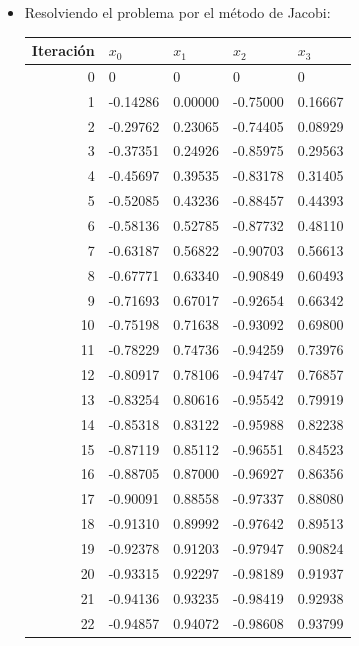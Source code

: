 \begin{itemize}
\item Resolviendo el problema por el método de Jacobi:

    \begin{center}
    \begin{tabular}{r|llll}
        Iteración & $x_0$ & $x_1$ & $x_2$ & $x_3$ \\
        \hline
        0 & 0 & 0 & 0 & 0 \\
        1 & -0.14286 & 0.00000 & -0.75000 & 0.16667 \\
        2 & -0.29762 & 0.23065 & -0.74405 & 0.08929 \\
        3 & -0.37351 & 0.24926 & -0.85975 & 0.29563 \\
        4 & -0.45697 & 0.39535 & -0.83178 & 0.31405 \\
        5 & -0.52085 & 0.43236 & -0.88457 & 0.44393 \\
        6 & -0.58136 & 0.52785 & -0.87732 & 0.48110 \\
        7 & -0.63187 & 0.56822 & -0.90703 & 0.56613 \\
        8 & -0.67771 & 0.63340 & -0.90849 & 0.60493 \\
        9 & -0.71693 & 0.67017 & -0.92654 & 0.66342 \\
        10 & -0.75198 & 0.71638 & -0.93092 & 0.69800 \\
        11 & -0.78229 & 0.74736 & -0.94259 & 0.73976 \\
        12 & -0.80917 & 0.78106 & -0.94747 & 0.76857 \\
        13 & -0.83254 & 0.80616 & -0.95542 & 0.79919 \\
        14 & -0.85318 & 0.83122 & -0.95988 & 0.82238 \\
        15 & -0.87119 & 0.85112 & -0.96551 & 0.84523 \\
        16 & -0.88705 & 0.87000 & -0.96927 & 0.86356 \\
        17 & -0.90091 & 0.88558 & -0.97337 & 0.88080 \\
        18 & -0.91310 & 0.89992 & -0.97642 & 0.89513 \\
        19 & -0.92378 & 0.91203 & -0.97947 & 0.90824 \\
        20 & -0.93315 & 0.92297 & -0.98189 & 0.91937 \\
        21 & -0.94136 & 0.93235 & -0.98419 & 0.92938 \\
        22 & -0.94857 & 0.94072 & -0.98608 & 0.93799 \\

\end{tabular}
\end{center}
\end{itemize}
